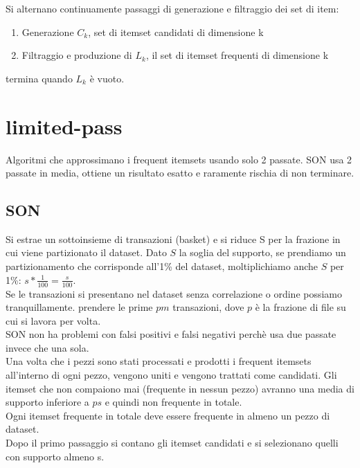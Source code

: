 \documentclass[a4paper]{report}
\begin{document}
Si alternano continuamente passaggi di generazione e filtraggio dei set di item:
\begin{enumerate}
\item Generazione $C_k$, set di itemset candidati di dimensione k
\item Filtraggio e produzione di $L_k$, il set di itemset frequenti di dimensione k
\end{enumerate}
termina quando $L_k$ è vuoto.

\section{limited-pass}
Algoritmi che approssimano i frequent itemsets usando solo 2 passate.
SON usa 2 passate in media, ottiene un risultato esatto e raramente rischia di non terminare.

\subsection{SON}
Si estrae un sottoinsieme di transazioni (basket) e si riduce S per la frazione in cui viene partizionato il dataset.
Dato $S$ la soglia del supporto, se prendiamo un partizionamento che corrisponde all'1\% del dataset, moltiplichiamo anche $S$ per 1\%: $s * \frac{1}{100}=\frac{s}{100}$.\\
Se le transazioni si presentano nel dataset senza correlazione o ordine possiamo tranquillamente.
 prendere le prime $pm$ transazioni, dove $p$ è la frazione di file su cui si lavora per volta.\\
SON non ha problemi con falsi positivi e falsi negativi perchè usa due passate invece che una sola.\\
Una volta che i pezzi sono stati processati e prodotti i frequent itemsets all'interno di ogni pezzo, vengono uniti e vengono trattati come candidati. Gli itemset che non compaiono mai (frequente in nessun pezzo) avranno una media di supporto inferiore a $ps$ e quindi non frequente in totale.\\
Ogni itemset frequente in totale deve essere frequente in almeno un pezzo di dataset.\\
Dopo il primo passaggio si contano gli itemset candidati e si selezionano quelli con supporto almeno s.\\
\end{document}
